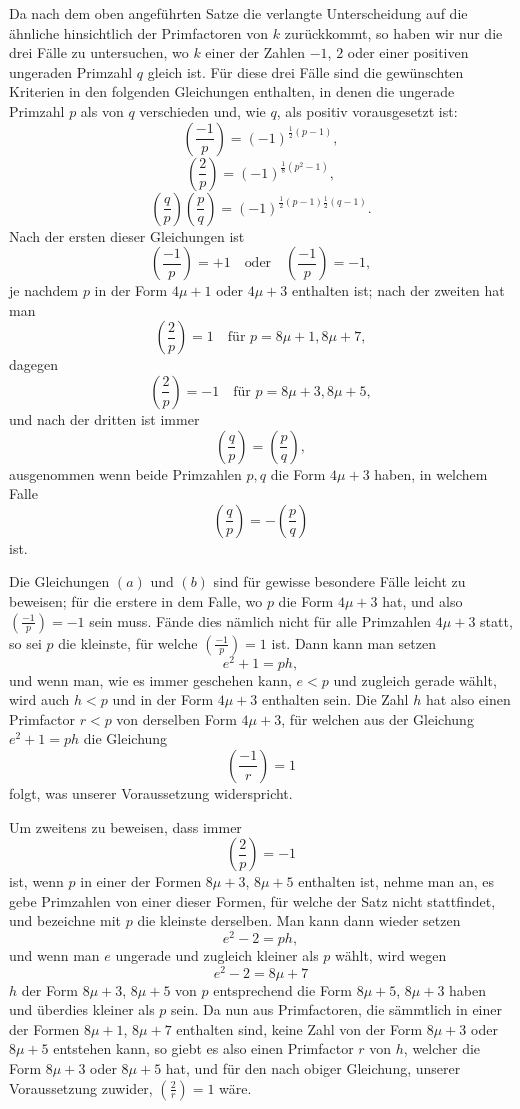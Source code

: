\documentclass[11pt]{article}
\newcommand{\J}[2]{\left(\frac{#1}{#2}\right)}
\begin{document}
Da nach dem oben angeführten Satze die verlangte Unterscheidung auf die ähnliche hinsichtlich der Primfactoren von $k$ zurückkommt, so haben wir nur die drei Fälle zu untersuchen, wo $k$ einer der Zahlen $-1$, $2$ oder einer positiven ungeraden Primzahl $q$ gleich ist. Für diese drei Fälle sind die gewünschten Kriterien in den folgenden Gleichungen enthalten, in denen die ungerade Primzahl $p$ als von $q$ verschieden und, wie $q$, als positiv vorausgesetzt ist:
\[
\tag{a} \J{-1}{p}=(-1)^{\frac12(p-1)},
\]
\[
\tag{b} \J{2}{p}=(-1)^{\frac18(p^2-1)},
\]
\[
\tag{c} \J{q}{p}\J{p}{q}=(-1)^{\frac12(p-1)\frac12(q-1)}.
\]
Nach der ersten dieser Gleichungen ist
\[
 \J{-1}{p}=+1\quad\text{oder}\quad \J{-1}{p}=-1,
\]
je nachdem $p$ in der Form $4\mu+1$ oder $4\mu+3$ enthalten ist; nach der zweiten hat man
\[
 \J{2}{p}=1\quad\text{für }p=8\mu+1,
 8\mu+7,
\]
dagegen
\[
 \J{2}{p}=-1\quad\text{für }p=8\mu+3,
 8\mu+5,
\]
und nach der dritten ist immer
\[
 \J{q}{p}=\J{p}{q},
\]
ausgenommen wenn beide Primzahlen $p,q$ die Form $4\mu+3$ haben, in welchem Falle
\[
 \J{q}{p}=-\J{p}{q}
\]
ist.

Die Gleichungen $(a)$ und $(b)$ sind für gewisse besondere Fälle leicht zu beweisen; für die erstere in dem Falle, wo $p$ die Form $4\mu+3$ hat, und also $\J{-1}{p}=-1$ sein muss. Fände dies nämlich nicht für alle Primzahlen $4\mu+3$ statt, so sei $p$ die kleinste, für welche $\J{-1}{p}=1$ ist. Dann kann man setzen
\[
 e^2+1=ph,
\]
und wenn man, wie es immer geschehen kann, $e<p$ und zugleich gerade wählt, wird auch $h<p$ und in der Form $4\mu+3$ enthalten sein. Die Zahl $h$ hat also einen Primfactor $r<p$ von derselben Form $4\mu+3$, für welchen aus der Gleichung $e^2+1=ph$ die Gleichung
\[
 \J{-1}{r}=1
\]
folgt, was unserer Voraussetzung widerspricht.

Um zweitens zu beweisen, dass immer
\[
 \J{2}{p}=-1
\]
ist, wenn $p$ in einer der Formen $8\mu+3$, $8\mu+5$ enthalten ist, nehme man an, es gebe Primzahlen von einer dieser Formen, für welche der Satz nicht stattfindet, und bezeichne mit $p$ die kleinste derselben. Man kann dann wieder setzen
\[
 e^2-2=ph,
\]
und wenn man $e$ ungerade und zugleich kleiner als $p$ wählt, wird wegen
\[
 e^2-2=8\mu+7
\]
$h$ der Form $8\mu+3$, $8\mu+5$ von $p$ entsprechend die Form $8\mu+5$, $8\mu+3$ haben und überdies kleiner als $p$ sein. Da nun aus Primfactoren, die sämmtlich in einer der Formen $8\mu+1$, $8\mu+7$ enthalten sind, keine Zahl von der Form $8\mu+3$ oder $8\mu+5$ entstehen kann, so giebt es also einen Primfactor $r$ von $h$, welcher die Form $8\mu+3$ oder $8\mu+5$ hat, und für den nach obiger Gleichung, unserer Voraussetzung zuwider, $\J{2}{r}=1$ wäre.
\end{document}
